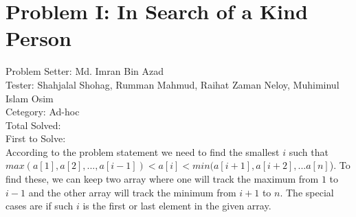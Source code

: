 \section*{Problem I: In Search of a Kind Person}
Problem Setter: Md. Imran Bin Azad \\
Tester: Shahjalal Shohag, Rumman Mahmud, Raihat Zaman Neloy, Muhiminul Islam Osim \\
Cetegory: Ad-hoc \\
Total Solved:  \\
First to Solve: \\

According to the problem statement we need to find the smallest $i$ such that
$max(a[1], a[2], ... , a[i-1]) < a[i] < min(a[i+1], a[i+2], ... a[n]$). To find
these, we can keep two array where one will track the maximum from $1$ to $i-1$
and the other array will track the minimum from $i+1$ to $n$. The special cases
are if such $i$ is the first or last element in the given array.